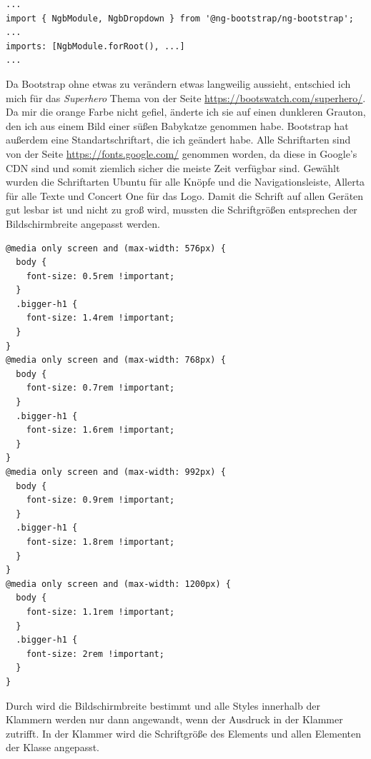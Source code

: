 \begin{lstlisting}[caption=app.module (Auszug) Importieren von ng-bootstrap,label=import-ng-bootstrap,style=TS]
...
import { NgbModule, NgbDropdown } from '@ng-bootstrap/ng-bootstrap';
...
imports: [NgbModule.forRoot(), ...]
...
\end{lstlisting}

Da Bootstrap ohne etwas zu verändern etwas langweilig aussieht, entschied ich mich für das \textit{Superhero} Thema von der Seite \url{https://bootswatch.com/superhero/}. Da mir die orange Farbe nicht gefiel, änderte ich sie auf einen dunkleren Grauton, den ich aus einem Bild einer süßen Babykatze genommen habe. Bootstrap hat außerdem eine Standartschriftart, die ich geändert habe. Alle Schriftarten sind von der Seite \url{https://fonts.google.com/} genommen worden, da diese in Google's \ac{CDN} sind und somit ziemlich sicher die meiste Zeit verfügbar sind. Gewählt wurden die Schriftarten Ubuntu für alle Knöpfe und die Navigationsleiste, Allerta für alle Texte und Concert One für das Logo. Damit die Schrift auf allen Geräten gut lesbar ist und nicht zu groß wird, mussten die Schriftgrößen entsprechen der Bildschirmbreite angepasst werden.

\begin{lstlisting}[caption=Schriftgrößen entsprechend der Bildschirmbreite,label=css-font-sizes,style=css]
@media only screen and (max-width: 576px) {
  body {
    font-size: 0.5rem !important;
  }
  .bigger-h1 {
    font-size: 1.4rem !important;
  }
}
@media only screen and (max-width: 768px) {
  body {
    font-size: 0.7rem !important;
  }
  .bigger-h1 {
    font-size: 1.6rem !important;
  }
}
@media only screen and (max-width: 992px) {
  body {
    font-size: 0.9rem !important;
  }
  .bigger-h1 {
    font-size: 1.8rem !important;
  }
}
@media only screen and (max-width: 1200px) {
  body {
    font-size: 1.1rem !important;
  }
  .bigger-h1 {
    font-size: 2rem !important;
  }
}
\end{lstlisting}

Durch  wird die Bildschirmbreite bestimmt und alle Styles innerhalb der Klammern werden nur dann angewandt, wenn der Ausdruck in der Klammer zutrifft. In der Klammer wird die Schriftgröße des  Elements und allen Elementen der Klasse  angepasst.

